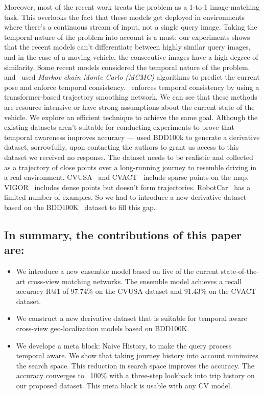 \documentclass[10pt,letterpaper]{article}
\begin{document}
Moreover, most of the recent work treats the problem as a 1-to-1 image-matching task. This overlooks the fact that these models get deployed in environments where there's a continuous stream of input, not a single query image. Taking the temporal nature of the problem into account is a must:  our experiments shows that the recent models can't differentiate between highly similar query images, and in the case of a moving vehicle, the consecutive images have a high degree of similarity. Some recent models considered the temporal nature of the problem.~\cite{bib7}  and~\cite{bib20,bib21,bib22} used \emph{Markov chain Monte Carlo (MCMC)} algorithms to predict the current pose and enforce temporal consistency.~\cite{bib24} enforces temporal consistency by using a transformer-based trajectory smoothing network. We can see that these methods are resource intensive or have strong assumptions about the current state of the vehicle. We explore an efficient technique to achieve the same goal.
Although the existing datasets aren't suitable for conducting experiments to prove that temporal awareness improves accuracy  — \cite{bib24} used BDD100k to generate a derivative dataset, sorrowfully, upon contacting the authors to grant us access to this dataset we received no response. The dataset needs to be realistic and collected as a trajectory of close points over a long-running journey to resemble driving in a real environment.  CVUSA~\cite{bib55} and CVACT~\cite{bib4} include sparse points on the map. VIGOR~\cite{bib5} includes dense points but doesn't form trajectories. RobotCar~\cite{bib6} has a limited number of examples. So we had to introduce a new derivative dataset based on the BDD100K~\cite{bib12} dataset to fill this gap.

\subsection*{In summary, the contributions of this paper are:}
\begin{itemize}
    \item We introduce a new ensemble model based on five of the current state-of-the-art  cross-view matching networks. The ensemble model achieves a recall accuracy R@1 of 97.74\% on the CVUSA dataset and 91.43\% on the CVACT dataset.
    \item We construct a new derivative dataset that is suitable for temporal aware cross-view geo-localization models based on BDD100K.
    \item We develope a meta block: Naive History, to make the query process temporal aware. We show that taking journey history into account minimizes the search space. This reduction in search space improves the accuracy.  The accuracy converges to ~100\% with a three-step lookback into trip history on our proposed dataset. This meta block is usable with any CV model.
\end{itemize}
\end{document}
